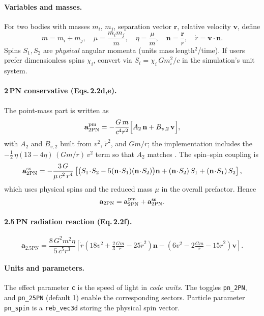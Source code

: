 \documentclass[11pt]{article}
\begin{document}
\paragraph{Variables and masses.}
For two bodies with masses $m_i$, $m_j$, separation vector $\mathbf{r}$,
relative velocity $\mathbf{v}$, define
\[
  m = m_i + m_j,\quad
  \mu = \frac{m_i m_j}{m},\quad
  \eta = \frac{\mu}{m},\quad
  \mathbf{n} = \frac{\mathbf{r}}{r},\quad
  \dot r = \mathbf{v}\cdot\mathbf{n}.
\]
Spins $S_1,S_2$ are \emph{physical} angular momenta (units mass\,length$^2$/time).
If users prefer dimensionless spins $\chi_i$, convert via
$S_i = \chi_i\,G m_i^2 / c$ in the simulation's unit system.

\paragraph{2\,PN conservative (Eqs.\,2.2d,e).}
The point-mass part is written as
\[
\mathbf{a}_{2\mathrm{PN}}^{\rm pm}
= -\frac{G\,m}{c^4 r^2}
   \Bigl[A_{2}\,\mathbf{n} + B_{v,2}\,\mathbf{v}\Bigr],
\]
with $A_2$ and $B_{v,2}$ built from $v^2$, $\dot r^2$, and $Gm/r$;
the implementation includes the \(-\tfrac12\,\eta(13-4\eta)\,(Gm/r)\,v^2\) term
so that $A_2$ matches \citet{Kidder1995}. The spin--spin coupling is
\[
  \mathbf{a}_{2\mathrm{PN}}^{\rm ss}
  = -\frac{3\,G}{\mu\,c^2\,r^4}
    \left[
      \bigl(S_1\!\cdot\!S_2 - 5(\mathbf{n}\!\cdot\!S_1)(\mathbf{n}\!\cdot\!S_2)\bigr)\mathbf{n}
      + (\mathbf{n}\!\cdot\!S_2)\,S_1 + (\mathbf{n}\!\cdot\!S_1)\,S_2
    \right],
\]
which uses physical spins and the reduced mass $\mu$ in the overall prefactor.
Hence
\[
  \mathbf{a}_{2\mathrm{PN}}=\mathbf{a}_{2\mathrm{PN}}^{\rm pm}+\mathbf{a}_{2\mathrm{PN}}^{\rm ss}.
\]

\paragraph{2.5\,PN radiation reaction (Eq.\,2.2f).}
\[
\mathbf{a}_{2.5\mathrm{PN}}
= \frac{8\,G^2 m^2 \eta}{5\,c^5 r^3}
\left[
  \dot r\left(18v^2+\tfrac{2}{3}\tfrac{Gm}{r}-25\dot r^2\right)\mathbf{n}
 -\left(6v^2-2\tfrac{Gm}{r}-15\dot r^2\right)\mathbf{v}
\right].
\]

\paragraph{Units and parameters.}
The effect parameter \texttt{c} is the speed of light in \emph{code units}.
The toggles \texttt{pn\_2PN}, and \texttt{pn\_25PN}
(default 1) enable the corresponding sectors. Particle parameter
\texttt{pn\_spin} is a \texttt{reb\_vec3d} storing the physical spin vector.
\end{document}
